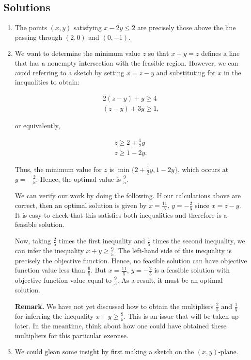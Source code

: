 \subsection*{Solutions}\label{solutions}

\begin{enumerate}
\def\labelenumi{\arabic{enumi}.}
\item
  The points \((x,y)\) satisfying \(x-2y \leq 2\) are precisely those
  above the line passing through \((2,0)\) and \((0,-1)\).
\item
  We want to determine the minimum value \(z\) so that \(x+y=z\) defines
  a line that has a nonempty intersection with the feasible region.
  However, we can avoid referring to a sketch by setting \(x=z-y\) and
  substituting for \(x\) in the inequalities to obtain:

  \begin{eqnarray*}
   2(z-y) + y \geq 4 \\
   (z-y) + 3y \geq 1,
  \end{eqnarray*}

  or equivalently,

  \begin{eqnarray*}
   z \geq 2+\frac{1}{2}y \\
   z \geq 1-2y,
  \end{eqnarray*}

  Thus, the minimum value for \(z\) is
  \(\min \{ 2+\frac{1}{2}y, 1-2y\}\), which occurs at
  \(y = -\frac{2}{5}\). Hence, the optimal value is \(\frac{9}{5}\).

  We can verify our work by doing the following. If our calculations
  above are correct, then an optimal solution is given by
  \(x = \frac{11}{5}\), \(y = -\frac{2}{5}\) since \(x = z - y\). It is
  easy to check that this satisfies both inequalities and therefore is a
  feasible solution.

  Now, taking \(\frac{2}{5}\) times the first inequality and
  \(\frac{1}{5}\) times the second inequality, we can infer the
  inequality \(x+y \geq \frac{9}{5}\). The left-hand side of this
  inequality is precisely the objective function. Hence, no feasible
  solution can have objective function value less than \(\frac{9}{5}\).
  But \(x = \frac{11}{5}\), \(y = -\frac{2}{5}\) is a feasible solution
  with objective function value equal to \(\frac{9}{5}\). As a result,
  it must be an optimal solution.

  \textbf{Remark.} We have not yet discussed how to obtain the
  multipliers \(\frac{2}{5}\) and \(\frac{1}{5}\) for inferring the
  inequality \(x+y \geq \frac{9}{5}\). This is an issue that will be
  taken up later. In the meantime, think about how one could have
  obtained these multipliers for this particular exercise.
\item
  We could glean some insight by first making a sketch on the
  \((x,y)\)-plane.


\end{enumerate}
